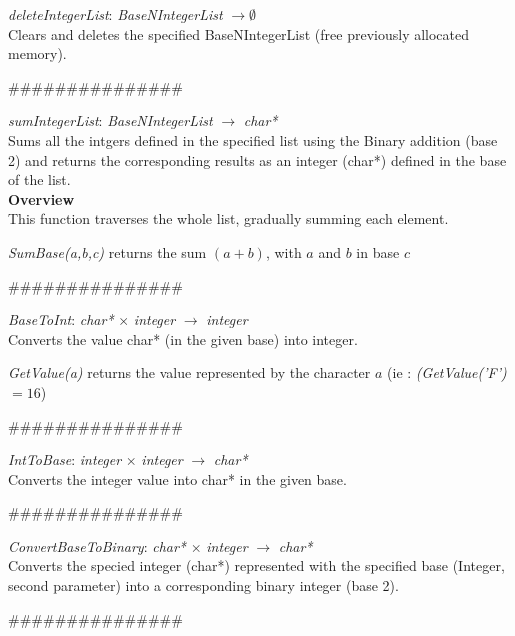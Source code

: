 \documentclass[book, backcover, english, nodocumentinfo]{upmethodology-document}
\newcommand{\nxtalgo}{\centerline{$$$$\#\#\#\#\#\#\#\#\#\#\#\#\#\#\#$$$$}}
\newcommand{\ov}{\textbf{Overview}}
\begin{document}
		\begin{minipage}{\linewidth}
			\textit{deleteIntegerList}: \textit{BaseNIntegerList} $\rightarrow \emptyset$\\
			Clears and deletes the specified BaseNIntegerList (free previously allocated memory).\\
			\label{algo:BNIL-DeleteIntegerList}
			
		\end{minipage}
		\nxtalgo{}

		\begin{minipage}{\linewidth}
			\textit{sumIntegerList}: \textit{BaseNIntegerList} $\rightarrow$ \textit{char*}\\
			Sums all the intgers defined in the specified list using the Binary addition (base 2) and returns the corresponding results as an integer (char*) defined in the base of the list.\\
			\ov\\
			This function traverses the whole list, gradually summing each element.
			\label{algo:BNIL-SumIntegerList}
			
			\textit{SumBase(a,b,c)} returns the sum $(a+b)$, with $a$ and $b$ in base $c$
		\end{minipage}
		\nxtalgo{}

		\begin{minipage}{\linewidth}
			\textit{BaseToInt}: \textit{char*} $\times$ \textit{integer} $\rightarrow$ \textit{integer}\\
			Converts the value char* (in the given base) into integer.
			\label{algo:BNIL-BaseToInt}
			
			\textit{GetValue(a)} returns the value represented by the character $a$
			(ie : \textit{(GetValue('F')} $= 16$)
		\end{minipage}
		\nxtalgo{}

		\begin{minipage}{\linewidth}
			\textit{IntToBase}: \textit{integer} $\times$ \textit{integer} $\rightarrow$ \textit{char*}\\
			Converts the integer value into char* in the given base.
			\label{algo:BNIL-IntToBase}
			
		\end{minipage}
		\nxtalgo{}

		\begin{minipage}{\linewidth}
			\textit{ConvertBaseToBinary}: \textit{char*} $\times$ \textit{integer} $\rightarrow$ \textit{char*}\\
			Converts the specied integer (char*) represented with the specified base (Integer, second parameter) into a corresponding binary integer (base 2).
			\label{algo:BNIL-ConvertBaseToBinary}
			
		\end{minipage}
		\nxtalgo{}
\end{document}
